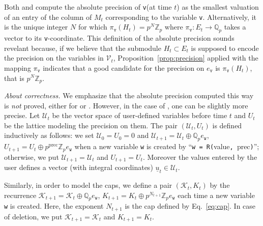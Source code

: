 \documentclass[sigconf]{acmart}
\newcommand{\Z}{\mathbb Z}
\newcommand{\Zp}{\Z_p}
\newcommand{\Q}{\mathbb Q}
\newcommand{\Qp}{\Q_p}
\newcommand{\calV}{\mathcal{V}}
\newcommand{\ttv}{\texttt{v}\xspace}
\newcommand{\ttw}{\texttt{w}\xspace}
\newcommand{\calU}{\mathcal{U}}
\newcommand{\calK}{\mathcal{K}}
\newcommand{\ZpLC}{\text{\color{output} \rm \tt ZpLC}\xspace}
\newcommand{\ZpLF}{\text{\color{output} \rm \tt ZpLF}\xspace}
\theoremstyle{definition}
\begin{document}
\noindent
Both \ZpLC and \ZpLF compute the absolute precision of \ttv (at time 
$t$) as the smallest valuation of an entry of the column of $M_t$ 
corresponding to the variable \ttv. Alternatively, it is
the unique integer $N$ for which $\pi_\ttv(H_t) = p^N \Zp$ where 
$\pi_\ttv : E_t \to \Qp$ takes a vector to its \ttv-coordinate.
This definition of the absolute precision sounds revelant because, if we 
believe that the submodule $H_t \subset E_t$ is supposed to encode the 
precision on the variables in $\calV_t$, 
Proposition~\ref{prop:precision} applied with the mapping $\pi_\ttv$ 
indicates that a good candidate for the precision on $e_\ttv$ is 
$\pi_\ttv(H_t)$, that is $p^N \Zp$.

\medskip

\noindent \textit{About correctness.}
%
We emphasize that the absolute precision computed this way is \emph{not} 
proved, either for \ZpLF or \ZpLC. However, in the case of \ZpLC, one
can be slightly more precise. Let $\calU_t$ be the vector space of 
user-defined variables before time $t$ and $U_t$ be the lattice
modeling the precision on them. The pair $(\calU_t, U_t)$ is defined 
inductively as follows: we set $\calU_0 = U_0 = 0$ and 
$\calU_{t+1} = \calU_t \oplus \Qp e_\ttw$,
$U_{t+1} = U_t \oplus p^{\text{prec}} \Zp e_\ttw$
when a new variable \ttw is created by
``\verb?w = R(?value\verb?, ?prec\verb?)?''; otherwise, we put 
$\calU_{t+1} = \calU_t$ and $U_{t+1} = U_t$. Moreover the values
entered by the user defines a vector (with integral coordinates)
$\underline u_t \in \calU_t$.

Similarly, in order to model the caps, we define a pair $(\calK_t, 
K_t)$ by the recurrence $\calK_{t+1} = \calK_t \oplus \Qp e_\ttw$,
$K_{t+1} = K_t \oplus p^{N_{t+1}} \Zp e_\ttw$
each time a new variable \ttw is created. 
Here, the exponent $N_{t+1}$ is the cap defined by Eq.~\eqref{eq:cap}.
In case of deletion, we put $\calK_{t+1} = \calK_t$ and $K_{t+1} = K_t$.
\end{document}

